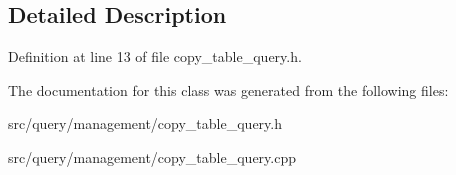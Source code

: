 \subsection{Detailed Description}


Definition at line 13 of file copy\+\_\+table\+\_\+query.\+h.



The documentation for this class was generated from the following files\+:\begin{DoxyCompactItemize}
\item 
src/query/management/copy\+\_\+table\+\_\+query.\+h\item 
src/query/management/copy\+\_\+table\+\_\+query.\+cpp\end{DoxyCompactItemize}
